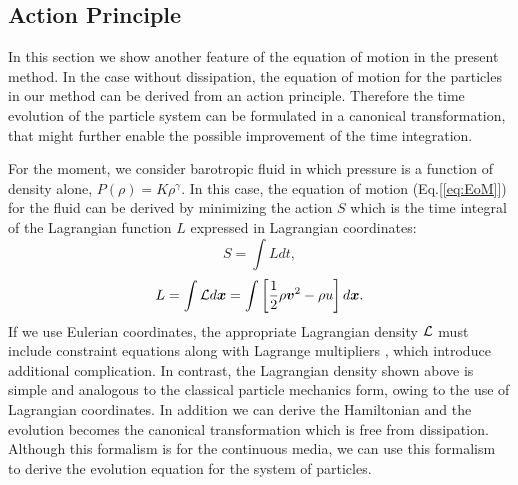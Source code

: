 \documentclass{cjour}
\newcommand{ \Vec   }[1]{ \mbox{\boldmath $ #1 $} }
\begin{document}
\begin{article}
\subsection{Action Principle}
                                                     \label{Sec:AP}
In this section we show another feature of the equation of motion 
in the present method.  
In the case without dissipation, 
the equation of motion for the particles 
in our method can be derived from an action principle. 
Therefore the time evolution of the particle system can be 
formulated in a canonical transformation, 
that might further enable the possible improvement 
of the time integration. 

For the moment, we consider barotropic fluid in which pressure is 
a function of density alone, $P(\rho)=K \rho^{\gamma}$. 
In this case, the equation of motion (Eq.[\ref{eq:EoM}]) 
for the fluid can be derived by minimizing the action $S$  
which is the time integral of the Lagrangian function $L$ 
expressed in Lagrangian coordinates:
\begin{equation}
                  S = \int L dt , 
\end{equation}
\begin{equation}
                  L = \int {\cal L} d\Vec{x}
                    = \int \left[ \frac{1}{2} \rho \Vec{v}^2 - \rho u 
                           \right] d\Vec{x} . 
                                                  \label{eq:L}
\end{equation}
If we use Eulerian coordinates, the appropriate Lagrangian density 
$\cal L$ must include constraint equations 
along with Lagrange multipliers \cite{Lin:1963,Serrin:1959},
which introduce additional complication. 
In contrast, the Lagrangian density shown above is simple and analogous 
to the classical particle mechanics form, 
owing to the use of Lagrangian coordinates. 
In addition we can derive the Hamiltonian and the evolution becomes 
the canonical transformation which is free from dissipation. 
Although this formalism is for the continuous media, 
we can use this formalism to derive the evolution equation for 
the system of particles. 


\end{article}
\end{document}
